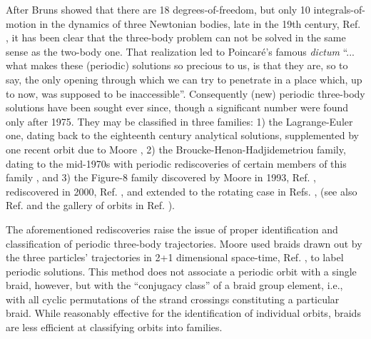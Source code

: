 \documentclass[twocolumn,showpacs,showkeys,preprintnumbers,amsmath,amssymb]{revtex4}
\begin{document}

\maketitle   


After Bruns showed that there are 18 degrees-of-freedom, but only 10 integrals-of-motion 
in the dynamics of three Newtonian bodies, late in the 19th century, Ref. \cite{Bruns1887}, 
it has been clear that the three-body problem can not be solved in the same sense 
as the two-body one. That realization led to Poincar\'{e}'s famous {\it dictum} \cite{Poincare1899}
``... what makes these (periodic) solutions so precious to us, is that 
they are, so to say, the only opening through which we can try to penetrate 
in a place which, up to now, was supposed to be inaccessible''.
Consequently (new) periodic three-body solutions have been sought ever since, 
though a significant number were found only after 1975. 
They may be classified in three families: 
1) the Lagrange-Euler one, dating back to the eighteenth century analytical 
solutions, supplemented by one recent orbit due to Moore \cite{Moore1993},
2) the Broucke-Henon-Hadjidemetriou family, dating to the mid-1970s
\cite{Broucke1975,Hadjidemetriou1975b,Hadjidemetriou1975c,Broucke1975b,Henon1976,Henon:1977}
with periodic rediscoveries of certain members of this family
\cite{Moore1993,Vanderbei:2004}, and 3) the Figure-8 family discovered by Moore in 1993, 
Ref. \cite{Moore1993}, rediscovered in 2000, Ref. \cite{Chenciner2000}, and extended 
to the rotating case in Refs.
\cite{Nauenberg2001,Chenciner2002,Simo2002,Chenciner2005,Broucke2006,Nauenberg2007},
(see also Ref. \cite{Suvakov:2012b} and the gallery of orbits in Ref.
\cite{gallery}).

The aforementioned rediscoveries raise the issue of proper identification and 
classification of periodic three-body trajectories. Moore \cite{Moore1993} used 
braids drawn out by the three particles' trajectories in 2+1 dimensional space-time, 
Ref. \cite{Prasolov1997}, to label periodic solutions. 
This method does not associate a periodic orbit with a single braid, however, but 
with the ``conjugacy class'' of a braid group element, i.e., with all cyclic 
permutations of the strand crossings %
constituting a particular braid.
While reasonably effective for the identification of individual orbits, 
braids are less efficient at classifying orbits into families.
\end{document}
